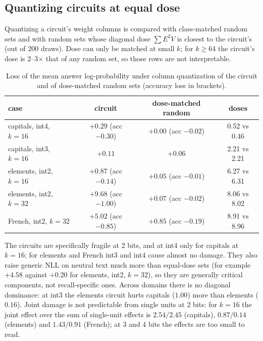 \documentclass[11pt]{article}
\begin{document}
\subsection{Quantizing circuits at equal dose}
Quantizing a circuit's weight columns is compared with class-matched random sets and with random sets whose diagonal dose $\sum E^2V$ is closest to the circuit's (out of 200 draws).
Dose can only be matched at small $k$; for $k\ge 64$ the circuit's dose is 2--3$\times$ that of any random set, so those rows are not interpretable.
\begin{table}[h]
\centering\small
\begin{tabular}{lccc}
\toprule
case & circuit & dose-matched random & doses\\
\midrule
capitals, int4, $k{=}16$ & $+0.29$ (acc $-0.30$) & $+0.00$ (acc $-0.02$) & 0.52 vs 0.46\\
capitals, int3, $k{=}16$ & $+0.11$ & $+0.06$ & 2.21 vs 2.21\\
elements, int2, $k{=}16$ & $+0.87$ (acc $-0.14$) & $+0.05$ (acc $-0.01$) & 6.27 vs 6.31\\
elements, int2, $k{=}32$ & $+9.68$ (acc $-1.00$) & $+0.07$ (acc $-0.02$) & 8.06 vs 8.02\\
French, int2, $k{=}32$ & $+5.02$ (acc $-0.85$) & $+0.85$ (acc $-0.19$) & 8.91 vs 8.96\\
\bottomrule
\end{tabular}
\caption{Loss of the mean answer log-probability under column quantization of the circuit and of dose-matched random sets (accuracy loss in brackets).}
\label{tab:circuitquant}
\end{table}
The circuits are specifically fragile at 2 bits, and at int4 only for capitals at $k{=}16$; for elements and French int3 and int4 cause almost no damage. They also raise generic NLL on neutral text much more than equal-dose sets
(for example $+4.58$ against $+0.20$ for elements, int2, $k{=}32$), so they are generally critical components, not recall-specific ones. Across domains there is no diagonal dominance: at int3 the elements circuit
hurts capitals ($1.00$) more than elements ($0.16$). Joint damage is not predictable from single units at 2 bits: for $k{=}16$ the joint effect over the sum of single-unit effects is
$2.54/2.45$ (capitals), $0.87/0.14$ (elements) and $1.43/0.91$ (French); at 3 and 4 bits the effects are too small to read.
\end{document}
